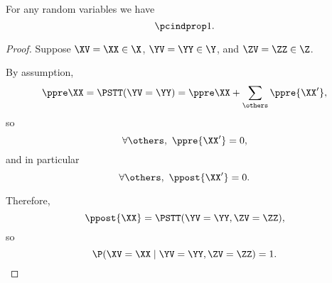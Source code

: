 \begin{proposition}
    For any random variables 
    \listrv
    we have
    $$\pcindprop1.$$%
\end{proposition}

\begin{proof}
  Suppose 
  $\XV = \XX \in \X$,
  $\YV = \YY \in \Y$, and
  $\ZV = \ZZ \in \Z$.

  By assumption,
  $$\ppre\XX = \PSTT(\YV = \YY) 
  = \ppre\XX + \sum_{\others}\ppre{\XX'},$$
    so
    $$\forall \others,\ \ppre{\XX'} = 0,$$
  and in particular
  $$\forall \others,\ \ppost{\XX'} = 0.$$

  Therefore, $$\ppost{\XX} = \PSTT(\YV = \YY, \ZV = \ZZ),$$
  so $$\P(\XV = \XX \mid \YV = \YY, \ZV = \ZZ) = 1.$$%
\end{proof}
